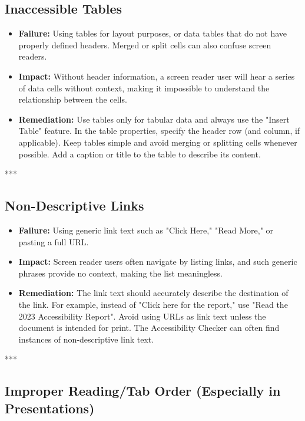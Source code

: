 \subsection{Inaccessible Tables}
\label{sub:inaccessible-tables}

\begin{itemize}
	\item \textbf{Failure:} Using tables for layout purposes, or data tables that do not have properly defined headers. Merged or split cells can also confuse screen readers.
	\item \textbf{Impact:} Without header information, a screen reader user will hear a series of data cells without context, making it impossible to understand the relationship between the cells.
	\item \textbf{Remediation:} Use tables only for tabular data and always use the "Insert Table" feature. In the table properties, specify the header row (and column, if applicable). Keep tables simple and avoid merging or splitting cells whenever possible. Add a caption or title to the table to describe its content.
\end{itemize}

***

\subsection{Non-Descriptive Links}
\label{sub:non-descriptive-links}

\begin{itemize}
	\item \textbf{Failure:} Using generic link text such as "Click Here," "Read More," or pasting a full URL.
	\item \textbf{Impact:} Screen reader users often navigate by listing links, and such generic phrases provide no context, making the list meaningless.
	\item \textbf{Remediation:} The link text should accurately describe the destination of the link. For example, instead of "Click here for the report," use "Read the 2023 Accessibility Report". Avoid using URLs as link text unless the document is intended for print. The Accessibility Checker can often find instances of non-descriptive link text.
\end{itemize}

***

\subsection{Improper Reading/Tab Order (Especially in Presentations)}
\label{sub:improper-reading-tab-order-especially-in-presentations}

